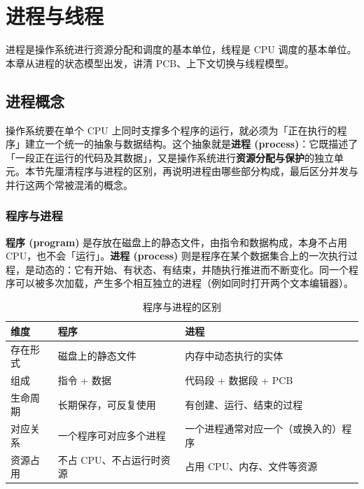 \clearpage
\begingroup
\let\clearpage\relax
\let\cleardoublepage\relax
\vspace*{\fill}
\chapter{进程与线程}
\begin{center}
进程是操作系统进行资源分配和调度的基本单位，线程是 CPU 调度的基本单位。本章从进程的状态模型出发，讲清 PCB、上下文切换与线程模型。
\end{center}
\vspace*{\fill}
\endgroup
\clearpage

\section{进程概念}

\noindent 操作系统要在单个 CPU 上同时支撑多个程序的运行，就必须为「正在执行的程序」建立一个统一的抽象与数据结构。这个抽象就是\textbf{进程 (process)}：它既描述了「一段正在运行的代码及其数据」，又是操作系统进行\textbf{资源分配与保护}的独立单元。本节先厘清程序与进程的区别，再说明进程由哪些部分构成，最后区分并发与并行这两个常被混淆的概念。

\subsection{程序与进程}

\noindent \textbf{程序 (program)} 是存放在磁盘上的静态文件，由指令和数据构成，本身不占用 CPU，也不会「运行」。\textbf{进程 (process)} 则是程序在某个数据集合上的一次执行过程，是动态的：它有开始、有状态、有结束，并随执行推进而不断变化。同一个程序可以被多次加载，产生多个相互独立的进程（例如同时打开两个文本编辑器）。

\begin{table}[H]
\centering
\caption{程序与进程的区别}
\begin{tabulary}{\textwidth}{LLL}
\toprule
维度 & 程序 & 进程 \\
\midrule
存在形式 & 磁盘上的静态文件 & 内存中动态执行的实体 \\
组成 & 指令 + 数据 & 代码段 + 数据段 + PCB \\
生命周期 & 长期保存，可反复使用 & 有创建、运行、结束的过程 \\
对应关系 & 一个程序可对应多个进程 & 一个进程通常对应一个（或换入的）程序 \\
资源占用 & 不占 CPU、不占运行时资源 & 占用 CPU、内存、文件等资源 \\
\bottomrule
\end{tabulary}
\end{table}

